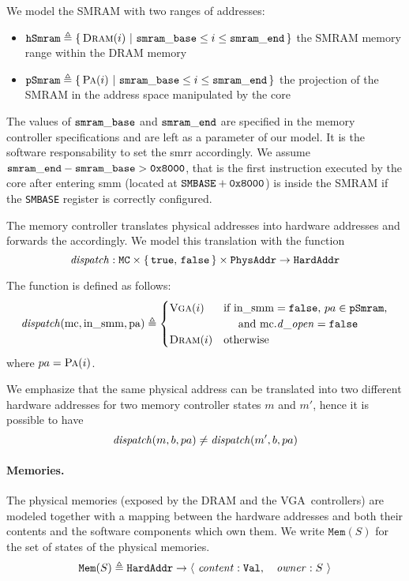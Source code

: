 We model the SMRAM with two ranges of addresses:
%
\begin{itemize}
\item
  $\texttt{hSmram} \triangleq \{\,\textsc{Dram}(i)\ |\ \mathtt{smram\_base} \leq i
    \le \mathtt{smram\_end}\,\}$ the SMRAM memory range within the DRAM memory
%
\item
  $\texttt{pSmram} \triangleq \{\,\textsc{Pa}(i)\ |\ \mathtt{smram\_base} \leq i
    \le \mathtt{smram\_end}\,\}$ the projection of the SMRAM in the address space
  manipulated by the core
\end{itemize}
%
The values of $\mathtt{smram\_base}$ and $\mathtt{smram\_end}$ are specified in the
memory controller specifications and are left as a parameter of our model.
%
It is the software responsability to set the \ac{smrr} accordingly.
%
We assume $\mathtt{smram\_end} - \mathtt{smram\_base} > \mathtt{0x8000}$, that is the
first instruction executed by the core after entering \ac{smm} (located at
$\texttt{SMBASE} + \mathtt{0x8000}$) is inside the SMRAM if the \texttt{SMBASE}
register is correctly configured.

The memory controller translates physical addresses into hardware addresses and
forwards the \IO accordingly.
%
We model this translation with the function
%
\[
  \mathit{dispatch} : \texttt{MC} \times \{\,\mathtt{true},\,\mathtt{false}\,\}
  \times \texttt{PhysAddr} \rightarrow \texttt{HardAddr}
\]
%
\begin{definition}
  \label{def:speccert2:dispatch}

  The function  is defined as follows:
  \[
    \mathit{dispatch}(\mathrm{mc}, \mathrm{in\_smm}, \mathrm{pa}) \triangleq
    \begin{cases}
      \textsc{Vga}(i) & \text{if }\mathrm{in\_smm} = \mathtt{false}\text{, }pa \in
      \texttt{pSmram}\text{,} \\
      & \quad\text{ and } \mathrm{mc}.\mathit{d\_open} = \mathtt{false}  \\
      \textsc{Dram}(i) & \text{otherwise}
    \end{cases}
  \]
%
  \qquad\qquad\qquad\qquad\qquad\qquad where $pa = \textsc{Pa}(i)$.
\end{definition}

We emphasize that the same physical address can be translated into two different
hardware addresses for two memory controller states $m$ and $m'$, hence it is
possible to have
%
\[
  \mathit{dispatch}(m, b, pa) \neq \mathit{dispatch}(m', b, pa)
\]

\paragraph{Memories.}
%
The physical memories (exposed by the DRAM and the VGA controllers) are modeled
together with a mapping between the hardware addresses and both their contents
and the software components which own them.
%
We write $\texttt{Mem}(S)$ for the set of states of the physical memories.
\[
  \texttt{Mem}(S) \triangleq \texttt{HardAddr} \rightarrow
  \langle~\mathit{content}: \texttt{Val},\quad\mathit{owner}: S~\rangle
\]

